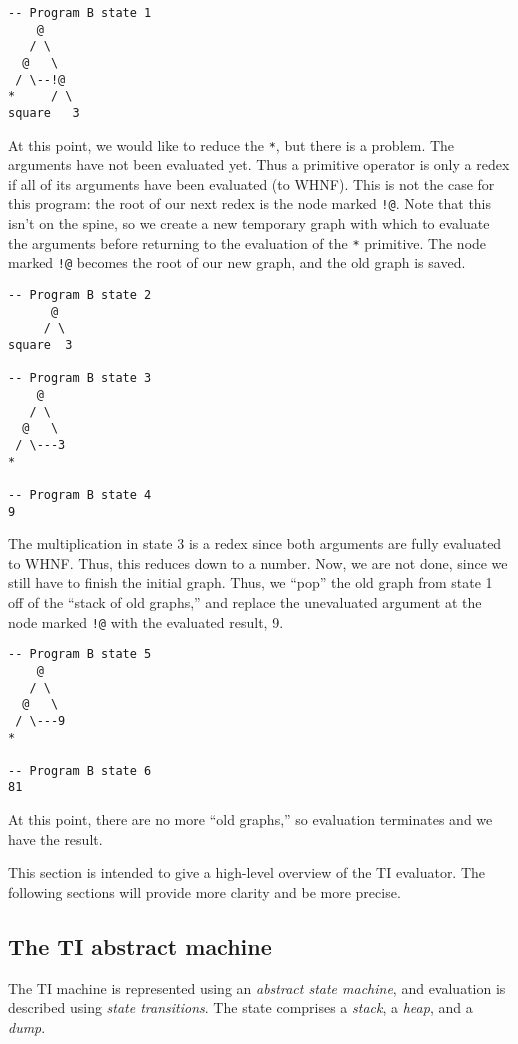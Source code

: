 \begin{verbatim}
-- Program B state 1
    @
   / \
  @   \
 / \--!@
*     / \
square   3
\end{verbatim}

At this point, we would like to reduce the \texttt{*}, but there is a problem. The arguments have not been evaluated yet. Thus a primitive operator is only a redex if all of its arguments have been evaluated (to WHNF). This is not the case for this program: the root of our next redex is the node marked \texttt{!@}. Note that this isn't on the spine, so we create a new temporary graph with which to evaluate the arguments before returning to the evaluation of the \texttt{*} primitive. The node marked \texttt{!@} becomes the root of our new graph, and the old graph is saved.

\begin{verbatim}
-- Program B state 2
      @
     / \
square  3

-- Program B state 3
    @
   / \
  @   \
 / \---3
*

-- Program B state 4
9
\end{verbatim}

The multiplication in state 3 is a redex since both arguments are fully evaluated to WHNF. Thus, this reduces down to a number. Now, we are not done, since we still have to finish the initial graph. Thus, we ``pop'' the old graph from state 1 off of the ``stack of old graphs,'' and replace the unevaluated argument at the node marked \texttt{!@} with the evaluated result, 9.

\begin{verbatim}
-- Program B state 5
    @
   / \
  @   \
 / \---9
*

-- Program B state 6
81
\end{verbatim}

At this point, there are no more ``old graphs,'' so evaluation terminates and we have the result.

This section is intended to give a high-level overview of the TI evaluator. The following sections will provide more clarity and be more precise.

\subsection{The TI abstract machine}
\label{sec:ti-machine}

The TI machine is represented using an \textit{abstract state machine}, and evaluation is described using \textit{state transitions}. The state comprises a \textit{stack}, a \textit{heap}, and a \textit{dump}.

